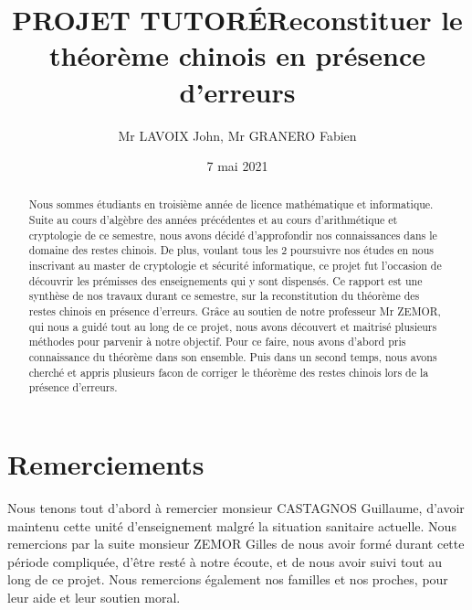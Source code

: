 \documentclass[a4paper, 11pt]{report}
\title{\: \: \: \: PROJET TUTORÉ\newline Reconstituer le théorème chinois en présence d’erreurs}
\author{Mr LAVOIX John, Mr GRANERO Fabien }
\date{7 mai 2021}
\begin{document}
\maketitle
\newpage
\begin{abstract}

Nous sommes étudiants en troisième année de licence mathématique et informatique. 
Suite au cours d'algèbre des années précédentes 
et au cours d'arithmétique et cryptologie de ce semestre, nous avons décidé d'approfondir nos connaissances dans le domaine des restes chinois. \newline
De plus, voulant tous les 2 poursuivre nos études en nous inscrivant au  master de cryptologie et sécurité informatique, ce projet fut l'occasion de découvrir les prémisses des enseignements qui y sont dispensés.  \newline
\newline
\newline
    Ce rapport est  une synthèse de nos travaux durant ce semestre, sur la reconstitution du théorème des restes chinois en présence d'erreurs.
Grâce au soutien de notre professeur Mr ZEMOR, qui nous a guidé tout au long de ce projet, nous avons découvert et maitrisé plusieurs méthodes pour parvenir à notre objectif. \newline
Pour ce faire, nous avons d'abord pris connaissance du théorème dans son ensemble. Puis dans un second temps, nous avons cherché et appris plusieurs facon de corriger le théorème des restes chinois lors de la présence d'erreurs.

\end{abstract}


\tableofcontents

\newpage

\chapter*{Remerciements}
\: Nous tenons tout d'abord à remercier monsieur CASTAGNOS Guillaume, d'avoir maintenu cette unité d'enseignement malgré la situation sanitaire actuelle.  
Nous remercions par la suite monsieur ZEMOR Gilles de nous avoir formé durant cette période compliquée, d'être resté à notre écoute, et de nous avoir suivi tout au long de ce projet.
\newline 
\newline
\: \: Nous remercions également nos familles et nos proches, pour leur aide et leur soutien moral.

\newpage
\end{document}

